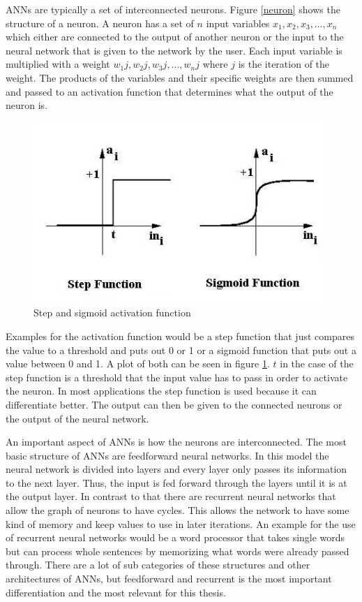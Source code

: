 ANNs are typically a set of interconnected neurons. Figure \ref{neuron} shows the structure of a neuron. A neuron has a set of $n$ input variables $x_1, x_2, x_3, ..., x_n$ which either are connected to the output of another neuron or the input to the neural network that is given to the network by the user. Each input variable is multiplied with a weight $w_1j, w_2j, w_3j, ..., w_nj$ where $j$ is the iteration of the weight. The products of the variables and their specific weights are then summed and passed to an activation function that determines what the output of the neuron is.

\begin{figure}[ht]
	\centering
  \includegraphics[width=11cm]{figures/activation_functions}
	\caption[Step and sigmoid activation function]{Step and sigmoid activation function \protect\footnotemark}
	\label{activation_functions}
\end{figure}

Examples for the activation function would be a step function that just compares the value to a threshold and puts out 0 or 1 or a sigmoid function that puts out a value between 0 and 1. A plot of both can be seen in figure \ref{activation_functions}. $t$ in the case of the step function is a threshold that the input value has to pass in order to activate the neuron. In most applications the step function is used because it can differentiate better. The output can then be given to the connected neurons or the output of the neural network.

An important aspect of ANNs is how the neurons are interconnected. The most basic structure of ANNs are feedforward neural networks. In this model the neural network is divided into layers and every layer only passes its information to the next layer. Thus, the input is fed forward through the layers until it is at the output layer. In contrast to that there are recurrent neural networks that allow the graph of neurons to have cycles. This allows the network to have some kind of memory and keep values to use in later iterations. An example for the use of recurrent neural networks would be a word processor that takes single words but can process whole sentences by memorizing what words were already passed through. There are a lot of sub categories of these structures and other architectures of ANNs, but feedforward and recurrent is the most important differentiation and the most relevant for this thesis.

